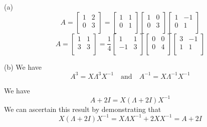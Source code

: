 \documentclass[a4paper]{article}
\begin{document}
(a) 
\[
	A = 
	\begin{bmatrix}
		1 & 2 \\
		0 & 3 \\
	\end{bmatrix} =
	\begin{bmatrix}
		1 & 1 \\
		0 & 1 \\
	\end{bmatrix}
	\begin{bmatrix}
		1 & 0 \\
		0 & 3 \\
	\end{bmatrix}
	\begin{bmatrix}
		1 & -1 \\
		0 & 1 \\
	\end{bmatrix}
\]
\[
	A = 
	\begin{bmatrix}
		1 & 1 \\
		3 & 3 \\
	\end{bmatrix}
	= \frac{1}{4}
	\begin{bmatrix}
		1 & 1 \\
		-1 & 3 \\
	\end{bmatrix}
	\begin{bmatrix}
		0 & 0 \\
		0 & 4 \\
	\end{bmatrix}
	\begin{bmatrix}
		3 & -1 \\
		1 & 1 \\
	\end{bmatrix}
\]

(b) We have
\[
	A^{3} = X \Lambda^{3} X^{-1} \quad \text{and} \quad A^{-1} = X \Lambda^{-1} X^{-1}
\]


We have
\[
	A + 2I = X \!\left( \Lambda + 2I \right) X^{-1}
\]
We can ascertain this result by demonstrating that
\[
	X \!\left( \Lambda + 2I \right) X^{-1} = X \Lambda X^{-1} + 2 XX^{-1} = A + 2I
\]
\end{document}
